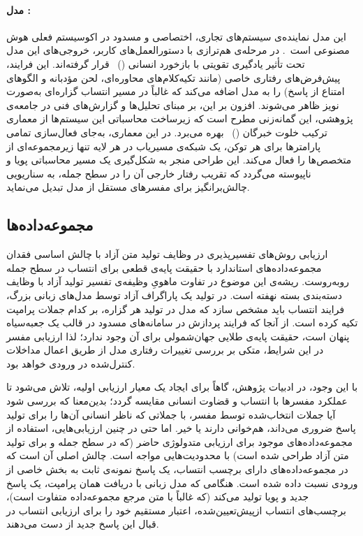 \paragraph{مدل :} این مدل نماینده‌ی سیستم‌های تجاری، اختصاصی و مسدود در اکوسیستم فعلی هوش مصنوعی است~\cite{openai2023gpt4}. در مرحله‌ی هم‌ترازی با دستورالعمل‌های کاربر، خروجی‌های این مدل تحت تأثیر یادگیری تقویتی با بازخورد انسانی ()~\cite{ouyang2022training} قرار گرفته‌اند. این فرایند، پیش‌فرض‌های رفتاری خاصی (مانند تکیه‌کلام‌های محاوره‌ای، لحن مؤدبانه و الگوهای امتناع از پاسخ) را به مدل اضافه می‌کند که غالباً در مسیر انتساب گزاره‌ای به‌صورت نویز ظاهر می‌شوند. افزون بر این، بر مبنای تحلیل‌ها و گزارش‌های فنی در جامعه‌ی پژوهشی، این گمانه‌زنی مطرح است که زیرساخت محاسباتی این سیستم‌ها از معماری ترکیب خلوت خبرگان ()~\cite{fedus2022switch} بهره می‌برد. در این معماری، به‌جای فعال‌سازی تمامی پارامترها برای هر توکن، یک شبکه‌ی مسیریاب در هر لایه تنها زیرمجموعه‌ای از متخصص‌ها را فعال می‌کند. این طراحی منجر به شکل‌گیری یک مسیر محاسباتی پویا و ناپیوسته می‌گردد که تقریب رفتار خارجی آن را در سطح جمله، به سناریویی چالش‌برانگیز برای مفسرهای مستقل از مدل تبدیل می‌نماید.


\subsection{مجموعه‌داده‌ها}\label{sec:5-1-2}

ارزیابی روش‌های تفسیرپذیری در وظایف تولید متن آزاد با چالش اساسی فقدان مجموعه‌داده‌های استاندارد با حقیقت پایه‌ی قطعی برای انتساب در سطح جمله روبه‌روست. ریشه‌ی این موضوع در تفاوت ماهویِ وظیفه‌ی تفسیر تولید آزاد با وظایف دسته‌بندی بسته نهفته است. در تولید یک پاراگراف آزاد توسط مدل‌های زبانی بزرگ، فرایند انتساب باید مشخص سازد که مدل در تولید هر گزاره، بر کدام جملات پرامپت تکیه کرده است. از آنجا که فرایند پردازش در سامانه‌های مسدود در قالب یک جعبه‌سیاه پنهان است، حقیقت پایه‌ی طلایی جهان‌شمولی برای آن وجود ندارد؛ لذا ارزیابی مفسر در این شرایط، متکی بر بررسی تغییرات رفتاری مدل از طریق اعمال مداخلات کنترل‌شده در ورودی خواهد بود.

با این وجود، در ادبیات پژوهش، گاهاً برای ایجاد یک معیار ارزیابی اولیه، تلاش می‌شود تا عملکرد مفسرها با انتساب و قضاوت انسانی مقایسه گردد؛ بدین‌معنا که بررسی شود آیا جملات انتخاب‌شده توسط مفسر، با جملاتی که ناظر انسانی آن‌ها را برای تولید پاسخ ضروری می‌داند، هم‌خوانی دارند یا خیر. اما حتی در چنین ارزیابی‌هایی، استفاده از مجموعه‌داده‌های موجود برای ارزیابی متدولوژی حاضر (که در سطح جمله و برای تولید متن آزاد طراحی شده است) با محدودیت‌هایی مواجه است. چالش اصلی آن است که در مجموعه‌داده‌های دارای برچسب انتساب، یک پاسخ نمونه‌ی ثابت به بخش خاصی از ورودی نسبت داده شده است. هنگامی که مدل زبانی با دریافت همان پرامپت، یک پاسخ جدید و پویا تولید می‌کند (که غالباً با متن مرجع مجموعه‌داده متفاوت است)، برچسب‌های انتساب ازپیش‌تعیین‌شده، اعتبار مستقیم خود را برای ارزیابی انتساب در قبال این پاسخ جدید از دست می‌دهند.

